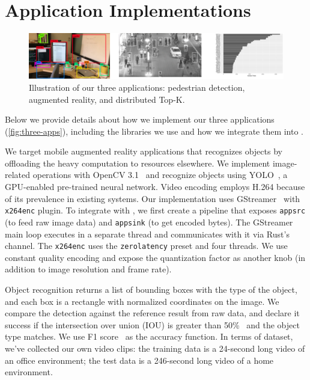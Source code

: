 \section{Application Implementations}
\label{appendix:appl-impl}

\begin{figure}
  \centering
  \includegraphics[width=\columnwidth]{figures/apps.pdf}
  \caption{Illustration of our three applications: pedestrian detection,
    augmented reality, and distributed Top-K.}
  \label{fig:three-apps}
\end{figure}

Below we provide details about how we implement our three applications
(\autoref{fig:three-apps}), including the libraries we use and how we integrate
them into \sysname{}.

 We target mobile augmented reality applications that
recognizes objects by offloading the heavy computation to resources elsewhere.
We implement image-related operations with OpenCV 3.1~\cite{opencvlibrary} and
recognize objects using YOLO~\cite{darknet13, redmon2016yolo9000}, a GPU-enabled
pre-trained neural network. Video encoding employs H.264 because of its
prevalence in existing systems. Our implementation uses
GStreamer~\cite{gstreamer} with \texttt{x264enc} plugin. To integrate with
\sysname{}, we first create a pipeline that exposes \texttt{appsrc} (to feed raw
image data) and \texttt{appsink} (to get encoded bytes). The GStreamer main loop
executes in a separate thread and \sysname{} communicates with it via Rust's
channel. The \texttt{x264enc} uses the \texttt{zerolatency} preset and four
threads. We use constant quality encoding and expose the quantization factor as
another knob (in addition to image resolution and frame rate).

Object recognition returns a list of bounding boxes with the type of the object,
and each box is a rectangle with normalized coordinates on the image. We compare
the detection against the reference result from raw data, and declare it success
if the intersection over union (IOU) is greater than
50\%~\cite{everingham2010pascal} and the object type matches. We use F1
score~\cite{Rijsbergen:1979:IR:539927} as the accuracy function. In terms of
dataset, we've collected our own video clips: the training data is a 24-second
long video of an office environment; the test data is a 246-second long video of
a home environment.

